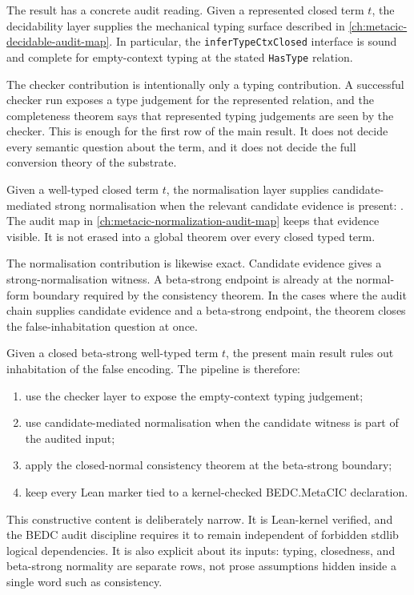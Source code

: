 The result has a concrete audit reading. Given a represented closed term $t$,
the decidability layer supplies the mechanical typing surface described in
\autoref{ch:metacic-decidable-audit-map}. In particular, the
\texttt{inferTypeCtxClosed} interface is sound and complete for empty-context
typing at the stated \texttt{HasType} relation.

The checker contribution is intentionally only a typing contribution. A
successful checker run exposes a type judgement for the represented relation,
and the completeness theorem says that represented typing judgements are seen
by the checker. This is enough for the first row of the main result. It does
not decide every semantic question about the term, and it does not decide the
full conversion theory of the substrate.

Given a well-typed closed term $t$, the normalisation layer supplies
candidate-mediated strong normalisation when the relevant candidate evidence is
present:
. The audit
map in \autoref{ch:metacic-normalization-audit-map} keeps that evidence
visible. It is not erased into a global theorem over every closed typed term.

The normalisation contribution is likewise exact. Candidate evidence gives a
strong-normalisation witness. A beta-strong endpoint is already at the
normal-form boundary required by the consistency theorem. In the cases where
the audit chain supplies candidate evidence and a beta-strong endpoint, the
theorem closes the false-inhabitation question at once.

Given a closed beta-strong well-typed term $t$, the present main result rules
out inhabitation of the false encoding. The pipeline is therefore:

\begin{enumerate}
\item use the checker layer to expose the empty-context typing judgement;
\item use candidate-mediated normalisation when the candidate witness is part
  of the audited input;
\item apply the closed-normal consistency theorem at the beta-strong boundary;
\item keep every Lean marker tied to a kernel-checked BEDC.MetaCIC declaration.
\end{enumerate}

This constructive content is deliberately narrow. It is Lean-kernel verified,
and the BEDC audit discipline requires it to remain independent of forbidden
stdlib logical dependencies. It is also explicit about its inputs: typing,
closedness, and beta-strong normality are separate rows, not prose assumptions
hidden inside a single word such as consistency.

